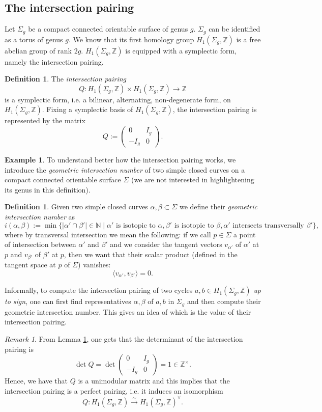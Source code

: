 \documentclass[a4paper,12 pt,titlepage,twoside]{book}
\newcommand{\numberset}{\mathbb}
\newcommand{\N}{\numberset{N}}
\newcommand{\Z}{\numberset{Z}}
\theoremstyle{plain}
\theoremstyle{theorem}
\theoremstyle{definition}
\newtheorem{defn}[thm]{Definition}
\newtheorem{exm}[thm]{Example}
\theoremstyle{remark}
\newtheorem{oss}[thm]{Remark}
\begin{document}
\subsection{The intersection pairing}
Let $\Sigma_g$ be a compact connected orientable surface of genus $g$. $\Sigma_g$ can be identified as a torus of genus $g$. We know that its first homology group $H_1(\Sigma_g,\Z)$ is a free abelian group of rank $2g$. $H_1(\Sigma_g,\Z)$ is equipped with a symplectic form, namely the intersection pairing.
\begin{defn}\label{lem: intersection pairing}
	The \emph{intersection pairing} $$Q \colon H_1(\Sigma_g,\Z) \times H_1(\Sigma_g,\Z) \rightarrow \Z$$ is a symplectic form, i.e. a bilinear, alternating, non-degenerate form, on $H_1(\Sigma_g,\Z).$ Fixing a symplectic basis of $H_1(\Sigma_g, \Z)$, the intersection pairing is represented by the matrix $$Q := \left(\begin{array}{c|c}
	0 & I_g \\ \hline -I_g & 0\end{array}\right).$$
\end{defn}
\begin{exm}
	To understand better how the intersection pairing works, we introduce the \emph{geometric intersection number} of two simple closed curves on a compact connected orientable surface $\Sigma$ (we are not interested in highlightening its genus in this definition).
	\begin{defn}
		Given two simple closed curves $\alpha,\beta \subset \Sigma$ we define their \emph{geometric intersection number} as $$i(\alpha,\beta):= \min\{|\alpha' \cap \beta'| \in \N \mid \alpha' \text{ is isotopic to } \alpha, \beta' \text{ is isotopic to } \beta, \alpha' \text{ intersects transversally } \beta'\},$$ where by transversal intersection we mean the following: if we call $p \in \Sigma$ a point of intersection between $\alpha'$ and $\beta'$ and we consider the tangent vectors $v_{\alpha'}$ of $\alpha'$ at $p$ and $v_{\beta'}$ of $\beta'$ at $p$, then we want that their scalar product (defined in the tangent space at $p$ of $\Sigma$) vanishes: $$\langle v_{\alpha'}, v_{\beta'}\rangle =0.$$
	\end{defn}
	Informally, to compute the intersection pairing of two cycles $a,b \in H_1(\Sigma_g,\Z)$ \emph{up to sign}, one can first find representatives $\alpha,\beta$ of $a,b$ in $\Sigma_g$ and then compute their geometric intersection number. This gives an idea of which is the value of their intersection pairing.
\end{exm}
\begin{oss}\label{rmk: intersection pairing is perfect}
	From Lemma \ref{lem: intersection pairing}, one gets that the determinant of the intersection pairing is $$\det Q = \det \left(\begin{array}{c|c} 0 & I_g \\ \hline -I_g & 0
	\end{array}\right) = 1 \in \Z^\times.$$ Hence, we have that $Q$ is a unimodular matrix and this implies that the intersection pairing is a perfect pairing, i.e. it induces an isomorphism $$Q \colon H_1(\Sigma_g,\Z) \stackrel{\sim}{\longrightarrow} H_1(\Sigma_g,\Z)^\vee.$$
\end{oss}
\end{document}

